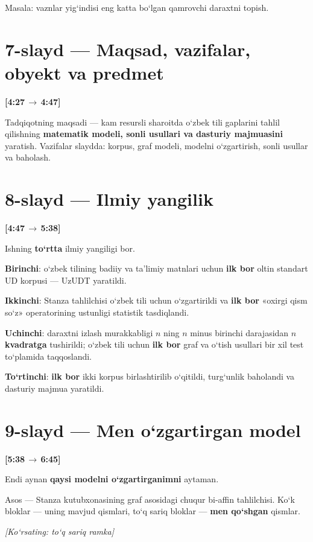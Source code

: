 \documentclass[14pt,a4paper]{extarticle}
\let\origsection\section
\renewcommand{\section}{\Needspace*{9\baselineskip}\origsection}
\newcommand{\timing}[2]{%
   \par\nobreak\noindent\textbf{[#1\,$\to$\,#2]}\par\vspace{0.3em}}
\newcommand{\say}[1]{\textbf{#1}}
\newcommand{\pointto}[1]{\par\vspace{0.3em}\noindent\textit{\small
   [Ko‘rsating: #1]}\par}
\begin{document}
Masala: vaznlar yig‘indisi eng katta bo‘lgan qamrovchi daraxtni topish.

\section*{7-slayd --- Maqsad, vazifalar, obyekt va predmet}
\timing{4:27}{4:47}

Tadqiqotning maqsadi --- kam resursli sharoitda o‘zbek tili gaplarini tahlil
qilishning \textbf{matematik modeli, sonli usullari va dasturiy majmuasini} yaratish.
Vazifalar slaydda: korpus, graf modeli, modelni o‘zgartirish, sonli usullar va
baholash.

\section*{8-slayd --- Ilmiy yangilik}
\timing{4:47}{5:38}

Ishning \textbf{to‘rtta} ilmiy yangiligi bor.

\textbf{Birinchi}: o‘zbek tilining badiiy va ta’limiy matnlari uchun \say{ilk bor}
oltin standart UD korpusi --- UzUDT yaratildi.

\textbf{Ikkinchi}: Stanza tahlilchisi o‘zbek tili uchun o‘zgartirildi va \say{ilk bor}
«oxirgi qism so‘z» operatorining ustunligi statistik tasdiqlandi.

\textbf{Uchinchi}: daraxtni izlash murakkabligi $n$ ning $n$ minus birinchi
darajasidan \textbf{$n$ kvadratga} tushirildi; o‘zbek tili uchun \say{ilk bor} graf
va o‘tish usullari bir xil test to‘plamida taqqoslandi.

\textbf{To‘rtinchi}: \say{ilk bor} ikki korpus birlashtirilib o‘qitildi, turg‘unlik
baholandi va dasturiy majmua yaratildi.

\section*{9-slayd --- Men o‘zgartirgan model}
\timing{5:38}{6:45}

Endi aynan \textbf{qaysi modelni o‘zgartirganimni} aytaman.

Asos --- Stanza kutubxonasining graf asosidagi chuqur bi-affin tahlilchisi. Ko‘k
bloklar --- uning mavjud qismlari, to‘q sariq bloklar --- \textbf{men qo‘shgan} qismlar.

\pointto{to‘q sariq ramka}
\end{document}

